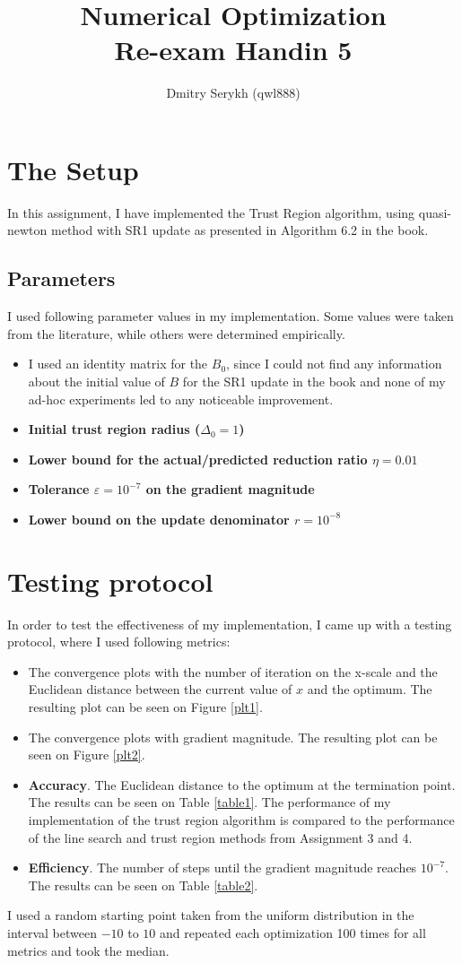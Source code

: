 \documentclass[a4paper]{article}
\title{\vspace{-5cm} Numerical Optimization \\ Re-exam Handin 5}
\author{Dmitry Serykh (qwl888)}
\begin{document}
\maketitle
\section{The Setup}
In this assignment, I have implemented the Trust Region algorithm, using
quasi-newton method with SR1 update as presented in Algorithm 6.2 in the book.

\subsection{Parameters}
I used following parameter values in my implementation. Some values were taken
from the literature, while others were determined empirically.
\begin{itemize}
\item I used an identity matrix for the $B_0$, since I could not find any
  information about the initial value of $B$ for the SR1 update in the book and
  none of my ad-hoc experiments led to any noticeable improvement.
\item \textbf{Initial trust region radius ($\Delta_0 = 1$)}
\item \textbf{Lower bound for the actual/predicted reduction ratio $\eta=0.01$}
\item \textbf{Tolerance $\varepsilon = 10^{-7}$ on the gradient magnitude}
\item \textbf{Lower bound on the update denominator $r=10^{-8}$}
\end{itemize}

\section{Testing protocol}
In order to test the effectiveness of my implementation, I came up with a
testing protocol, where I used following metrics:
\begin{itemize}
\item The convergence plots with the number of iteration on the x-scale and the
  Euclidean distance between the current value of $x$ and the
  optimum. The resulting plot can be seen on Figure \ref{plt1}.
\item The convergence plots with gradient magnitude.
  The resulting plot can be seen on Figure \ref{plt2}. 
\item \textbf{Accuracy}. The Euclidean distance to the optimum at the
  termination point. The results can be seen on Table \ref{table1}.
  The performance of my implementation of the trust
  region algorithm is compared to the performance of the line search and trust
  region methods from Assignment 3 and 4.
\item \textbf{Efficiency}. The number of steps until the gradient
  magnitude reaches $10^{-7}$. The results can be seen on Table \ref{table2}.
\end{itemize}
I used a random starting point taken from the uniform distribution in the
interval between $-10$ to $10$ and repeated each optimization 100 times for all
metrics and took the median.
\end{document}

